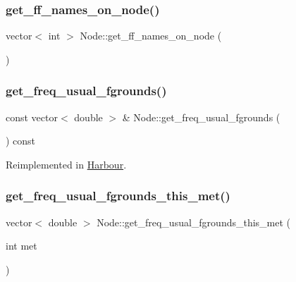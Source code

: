 \mbox{\label{class_node_adc251dd184fadf1e4460bd1be0df07a3}} 
\subsubsection{\texorpdfstring{get\_ff\_names\_on\_node()}{get\_ff\_names\_on\_node()}}
{\footnotesize\ttfamily vector$<$ int $>$ Node\+::get\+\_\+ff\+\_\+names\+\_\+on\+\_\+node (\begin{DoxyParamCaption}{ }\end{DoxyParamCaption})}

\mbox{\label{class_node_a37fdbc3ddd2cd48c49d196a14c0740b4}} 
\subsubsection{\texorpdfstring{get\_freq\_usual\_fgrounds()}{get\_freq\_usual\_fgrounds()}}
{\footnotesize\ttfamily const vector$<$ double $>$ \& Node\+::get\+\_\+freq\+\_\+usual\+\_\+fgrounds (\begin{DoxyParamCaption}{ }\end{DoxyParamCaption}) const\hspace{0.3cm}{\ttfamily [virtual]}}



Reimplemented in \mbox{\hyperlink{class_harbour_aa221dcf584dfc88a172c0aa890fee7ed}{Harbour}}.

\mbox{\label{class_node_ab317835e72ccdd4c508be8b1667bc56f}} 
\subsubsection{\texorpdfstring{get\_freq\_usual\_fgrounds\_this\_met()}{get\_freq\_usual\_fgrounds\_this\_met()}}
{\footnotesize\ttfamily vector$<$ double $>$ Node\+::get\+\_\+freq\+\_\+usual\+\_\+fgrounds\+\_\+this\+\_\+met (\begin{DoxyParamCaption}\item[{int}]{met }\end{DoxyParamCaption})\hspace{0.3cm}{\ttfamily [virtual]}}




